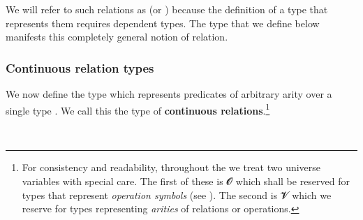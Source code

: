 We will refer to such relations as  (or ) because the definition of a type that represents them requires dependent types. The  type that we define below manifests this completely general notion of relation.

\subsubsection{Continuous relation types}\label{continuous-relation-types}

We now define the type  which represents predicates of arbitrary arity over a single type . We call this the type of \textbf{continuous relations}.\footnote{%
For consistency and readability, throughout the \ualib we treat two universe variables with special care. The first of these is 𝓞 which shall be reserved for types that represent \emph{operation symbols} (see ). The second is 𝓥 which we reserve for types representing \emph{arities} of relations or operations.}
\ccpad
\begin{code}%
\>[0]\AgdaSpace{}%
\AgdaSymbol{:}\AgdaSpace{}%
\AgdaSpace{}%
\AgdaSpace{}%
\AgdaSpace{}%
\AgdaSpace{}%
\AgdaSpace{}%
\AgdaSpace{}%
\AgdaSymbol{(}\AgdaSpace{}%
\AgdaSymbol{:}\AgdaSpace{}%
\AgdaSymbol{)}\AgdaSpace{}%
\AgdaSpace{}%
\AgdaSpace{}%
\AgdaSpace{}%
\AgdaSpace{}%
\AgdaSpace{}%
\AgdaSpace{}%
\AgdaSpace{}%
\<%
\\
\>[0]\AgdaSpace{}%
\AgdaSpace{}%
\AgdaSpace{}%
\AgdaSpace{}%
\AgdaSymbol{=}\AgdaSpace{}%
\AgdaSymbol{(}\AgdaSpace{}%
\AgdaSpace{}%
\AgdaSymbol{)}\AgdaSpace{}%
\AgdaSpace{}%
\AgdaSpace{}%
\<%
\end{code}

